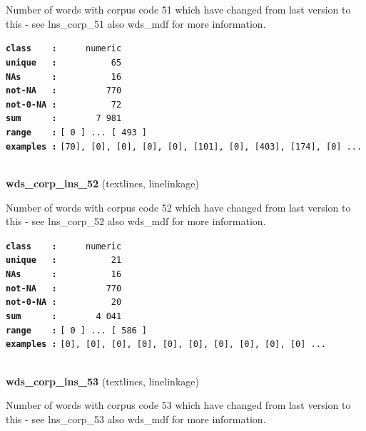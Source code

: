 \documentclass[]{article}
\begin{document}
Number of words with corpus code 51 which have changed from last version
to this - see lns\_corp\_51 also wds\_mdf for more information.

\textbf{\texttt{class\ \ \ \ :}} \texttt{~~~~~numeric}\\
\textbf{\texttt{unique\ \ \ :}} \texttt{~~~~~~~~~~65}\\
\textbf{\texttt{NAs\ \ \ \ \ \ :}} \texttt{~~~~~~~~~~16}\\
\textbf{\texttt{not-NA\ \ \ :}} \texttt{~~~~~~~~~770}\\
\textbf{\texttt{not-0-NA\ :}} \texttt{~~~~~~~~~~72}\\
\textbf{\texttt{sum\ \ \ \ \ \ :}} \texttt{~~~~~~~7~981}\\
\textbf{\texttt{range\ \ \ \ :}}
\texttt{{[}\ 0\ {]}\ ...\ {[}\ 493\ {]}}\\
\textbf{\texttt{examples\ :}}
\texttt{{[}70{]},\ {[}0{]},\ {[}0{]},\ {[}0{]},\ {[}0{]},\ {[}101{]},\ {[}0{]},\ {[}403{]},\ {[}174{]},\ {[}0{]}\ ...}\\

~

\textbf{wds\_corp\_ins\_52} (textlines, linelinkage)

Number of words with corpus code 52 which have changed from last version
to this - see lns\_corp\_52 also wds\_mdf for more information.

\textbf{\texttt{class\ \ \ \ :}} \texttt{~~~~~numeric}\\
\textbf{\texttt{unique\ \ \ :}} \texttt{~~~~~~~~~~21}\\
\textbf{\texttt{NAs\ \ \ \ \ \ :}} \texttt{~~~~~~~~~~16}\\
\textbf{\texttt{not-NA\ \ \ :}} \texttt{~~~~~~~~~770}\\
\textbf{\texttt{not-0-NA\ :}} \texttt{~~~~~~~~~~20}\\
\textbf{\texttt{sum\ \ \ \ \ \ :}} \texttt{~~~~~~~4~041}\\
\textbf{\texttt{range\ \ \ \ :}}
\texttt{{[}\ 0\ {]}\ ...\ {[}\ 586\ {]}}\\
\textbf{\texttt{examples\ :}}
\texttt{{[}0{]},\ {[}0{]},\ {[}0{]},\ {[}0{]},\ {[}0{]},\ {[}0{]},\ {[}0{]},\ {[}0{]},\ {[}0{]},\ {[}0{]}\ ...}\\

~

\textbf{wds\_corp\_ins\_53} (textlines, linelinkage)

Number of words with corpus code 53 which have changed from last version
to this - see lns\_corp\_53 also wds\_mdf for more information.
\end{document}
